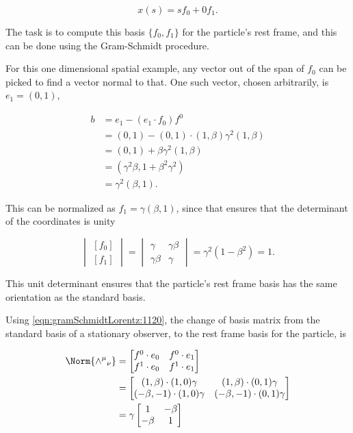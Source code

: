 \begin{equation}\label{eqn:gramSchmidtLorentz:640}
x(s) = s f_0 + 0 f_1.
\end{equation}

The task is to compute this basis $\{f_0, f_1\}$ for the particle's rest frame, and this can be done using the Gram-Schmidt procedure.

For this one dimensional spatial example, any vector out of the span of $f_0$ can be picked to find a vector normal to that.  One such vector, chosen arbitrarily, is $e_1 = (0, 1)$,

\begin{align*}
b
&= e_1 - (e_1 \cdot f_0) f^0 \\
&= (0, 1) - (0, 1) \cdot (1, \beta) \gamma^2 (1, \beta) \\
&= (0, 1) + \beta \gamma^2 (1, \beta) \\
&= (\gamma^2 \beta, 1 + \beta^2 \gamma^2) \\
&= \gamma^2 (\beta, 1 ).
\end{align*}

This can be normalized as $f_1 = \gamma(\beta, 1)$, since that ensures that the determinant of the coordinates is unity

\begin{equation}\label{eqn:gramSchmidtLorentz:685}
\begin{vmatrix}
[f_0] \\
[f_1]
\end{vmatrix}
=
\begin{vmatrix}
\gamma & \gamma \beta \\
\gamma \beta & \gamma
\end{vmatrix}
=
\gamma^2 ( 1 - \beta^2)
= 1.
\end{equation}

This unit determinant ensures that the particle's rest frame basis has the same orientation as the standard basis.

Using \ref{eqn:gramSchmidtLorentz:1120}, the change of basis matrix from the standard basis of a stationary observer, to the rest frame basis for the particle, is

\begin{equation}\label{eqn:gramSchmidtLorentz:720}
\begin{aligned}
\Norm{ {\wedge^\mu}_\nu }
&=
\begin{bmatrix}
f^0 \cdot e_0
&
f^0 \cdot e_1
\\
f^1 \cdot e_0
 &
f^1 \cdot e_1
\end{bmatrix} \\
&=
\begin{bmatrix}
( 1, \beta )
\cdot
(1, 0)
\gamma &
( 1, \beta )
\cdot
(0, 1)
\gamma \\
( -\beta, -1)
\cdot
(1, 0)
\gamma &
( -\beta, -1)
\cdot
(0, 1)
\gamma
\end{bmatrix} \\
&=
\gamma
\begin{bmatrix}
1 & - \beta \\
- \beta & 1
\end{bmatrix}
\end{aligned}
\end{equation}

